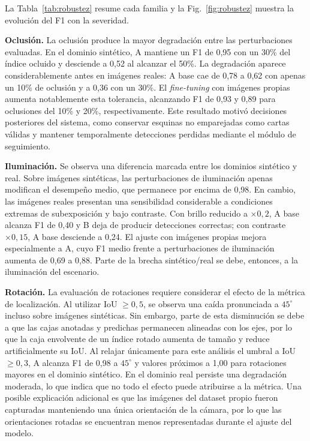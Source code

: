 \documentclass[conference,a4paper]{IEEEtran}
\begin{document}
La Tabla~\ref{tab:robustez} resume cada familia y la Fig.~\ref{fig:robustez} muestra la evolución del F1 con la severidad.

\textbf{Oclusión.} La oclusión produce la mayor degradación entre las perturbaciones evaluadas. En el dominio sintético, A mantiene un F1 de 0,95 con un 30\% del índice ocluido y desciende a 0,52 al alcanzar el 50\%. La degradación aparece considerablemente antes en imágenes reales: A base cae de 0,78 a 0,62 con apenas un 10\% de oclusión y a 0,36 con un 30\%. El \textit{fine-tuning} con imágenes propias aumenta notablemente esta tolerancia, alcanzando F1 de 0,93 y 0,89 para oclusiones del 10\% y 20\%, respectivamente. Este resultado motivó decisiones posteriores del sistema, como conservar esquinas no emparejadas como cartas válidas y mantener temporalmente detecciones perdidas mediante el módulo de seguimiento.

\textbf{Iluminación.} Se observa una diferencia marcada entre los dominios sintético y real. Sobre imágenes sintéticas, las perturbaciones de iluminación apenas modifican el desempeño medio, que permanece por encima de 0,98. En cambio, las imágenes reales presentan una sensibilidad considerable a condiciones extremas de subexposición y bajo contraste. Con brillo reducido a $\times0,2$, A base alcanza F1 de 0,40 y B deja de producir detecciones correctas; con contraste $\times0,15$, A base desciende a 0,24. El ajuste con imágenes propias mejora especialmente a A, cuyo F1 medio frente a perturbaciones de iluminación aumenta de 0,69 a 0,88. Parte de la brecha sintético/real se debe, entonces, a la iluminación del escenario.

\textbf{Rotación.} La evaluación de rotaciones requiere considerar el efecto de la métrica de localización. Al utilizar IoU $\geq 0,5$, se observa una caída pronunciada a $45^\circ$ incluso sobre imágenes sintéticas. Sin embargo, parte de esta disminución se debe a que las cajas anotadas y predichas permanecen alineadas con los ejes, por lo que la caja envolvente de un índice rotado aumenta de tamaño y reduce artificialmente su IoU. Al relajar únicamente para este análisis el umbral a IoU $\geq 0,3$, A alcanza F1 de 0,98 a $45^\circ$ y valores próximos a 1,00 para rotaciones mayores en el dominio sintético. En el dominio real persiste una degradación moderada, lo que indica que no todo el efecto puede atribuirse a la métrica. Una posible explicación adicional es que las imágenes del dataset propio fueron capturadas manteniendo una única orientación de la cámara, por lo que las orientaciones rotadas se encuentran menos representadas durante el ajuste del modelo.
\end{document}
